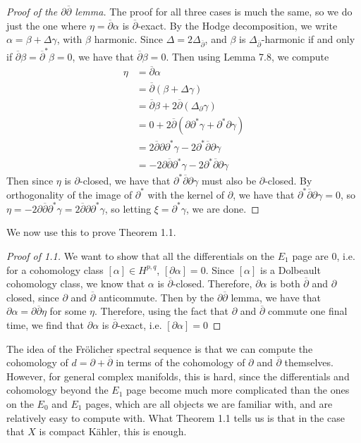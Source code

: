 \documentclass[psamsfonts, 12pt]{amsart}
\theoremstyle{definition}
\theoremstyle{remark}
\newcommand{\dbar}{\overline{\partial}}
\begin{document}
%
\begin{proof}[Proof of the $\partial\dbar$ lemma]
The proof for all three cases is much the same, so we do just the one where
$\eta = \dbar\alpha$ is $\dbar$-exact. By the Hodge decomposition, we write
$\alpha = \beta + \Delta\gamma$, with $\beta$ harmonic. Since
$\Delta = 2\Delta_{\dbar}$, and $\beta$ is $\Delta_{\dbar}$-harmonic if and only
if $\dbar\beta = \dbar^*\beta = 0$, we have that $\dbar\beta = 0$. Then
using Lemma 7.8, we compute
\begin{align*}
\eta &= \dbar\alpha \\
&= \dbar(\beta + \Delta\gamma) \\
&= \dbar\beta + 2\dbar(\Delta_\partial\gamma) \\
&= 0 + 2\dbar(\partial\partial^*\gamma + \partial^*\partial\gamma) \\
&= 2\dbar\partial\partial^*\gamma - 2\partial^*\dbar\partial\gamma \\
&= -2\partial\dbar\partial^*\gamma - 2\partial^*\dbar\partial\gamma
\end{align*}
Then since $\eta$ is $\partial$-closed, we have that $\partial^*\dbar\partial\gamma$
must also be $\partial$-closed. By orthogonality of the image of $\partial^*$ with
the kernel of $\partial$, we have that $\partial^*\dbar\partial\gamma = 0$,
so $\eta = -2\partial\dbar\partial^*\gamma = 2\dbar\partial\partial^*\gamma$,
so letting $\xi = \partial^*\gamma$, we are done.
\end{proof}
%
We now use this to prove Theorem 1.1.
%
\begin{proof}[Proof of 1.1]
We want to show that all the differentials on the $E_1$ page are $0$, i.e.
for a cohomology class $[\alpha] \in H^{p,q}$, $[\partial\alpha] = 0$. Since
$[\alpha]$ is a Dolbeault cohomology class, we know that $\alpha$ is $\dbar$-closed.
Therefore, $\partial\alpha$ is both $\dbar$ and $\partial$ closed, since $\partial$
and $\dbar$ anticommute. Then by the $\partial\dbar$ lemma, we have that
$\partial\alpha = \partial\dbar\eta$ for some $\eta$. Therefore, using the
fact that $\partial$ and $\dbar$ commute one final time, we find that
$\partial\alpha$ is $\dbar$-exact, i.e. $[\partial\alpha] = 0$
\end{proof}
%
The idea of the Fr\"olicher spectral sequence is that we can compute the
cohomology of $d = \partial + \dbar$ in terms of the cohomology of $\partial$
and $\dbar$ themselves. However, for general complex manifolds, this is hard,
since the differentials and cohomology beyond the $E_1$ page become much
more complicated than the ones on the $E_0$ and $E_1$ pages, which are all
objects we are familiar with, and are relatively easy to compute with. What
Theorem 1.1 tells us is that in the case that $X$ is compact K\"ahler, this
is enough.
%
\end{document}
